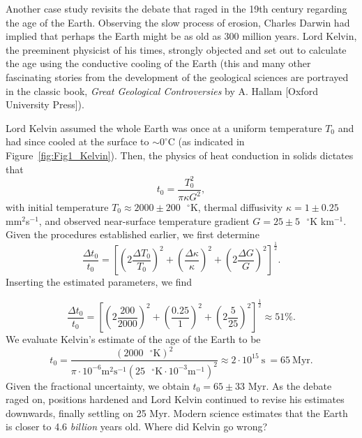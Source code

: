Another case study revisits the debate that raged in the 19th century regarding the age of the Earth.
Observing the slow process of erosion, Charles Darwin had implied that perhaps the Earth might be
as old as 300 million years.  Lord Kelvin, the preeminent physicist of his times, strongly objected
and set out to calculate the age using the conductive cooling of the Earth (this and many other fascinating
stories from the development of the geological sciences are portrayed in the classic book, \emph{Great Geological Controversies} by
A. Hallam [Oxford University Press]).
\begin{example}
Lord Kelvin assumed the whole Earth
was once at a uniform temperature $T_{0}$ and had since cooled at the surface to $\sim 0^{\circ}$C (as indicated in Figure~\ref{fig:Fig1_Kelvin}).
Then, the physics of heat conduction in solids dictates that
\begin{equation}
	t_{0} = \frac{T_{0}^{2}}{\pi \kappa G^{2}},
\end{equation}
with initial temperature $T_{0}  \approx 2000 \pm 200\mbox{ }^{\circ}\mbox{K}$, thermal diffusivity
$\kappa = 1 \pm 0.25$ mm$^{2}$s$^{-1}$, and observed near-surface temperature gradient
$G = 25 \pm 5\mbox{ }^{\circ}\mbox{K}$ km$^{-1}$.  Given the procedures established earlier, we first determine
\begin{equation}
	\frac{\Delta t_{0}}{t_{0}} = \left[ \left(2\frac{\Delta T_{0}}{T_{0}}\right)^{2} + \left(\frac{\Delta \kappa}{\kappa}\right)^{2} + \left(2\frac{\Delta G}{G}\right)^{2} \right]^{\frac{1}{2}}.
\end{equation}
Inserting the estimated parameters, we find

\begin{equation}
	\frac{\Delta t_{0}}{t_{0}} = \left[ \left(2\frac{200}{2000}\right)^{2} + \left(\frac{0.25}{1}\right)^{2} + \left(2\frac{5}{25}\right)^{2} \right]^{\frac{1}{2}} \approx 51\%.
\end{equation}
We evaluate Kelvin's estimate of the age of the Earth to be
\begin{equation}
	t_{0} = \frac{(2000\mbox{ }^{\circ}\mbox{K})^{2}}{\pi \cdot 10^{-6} \mbox{m}^{2} \mbox{s}^{-1} (25\mbox{ }^{\circ}\mbox{K} \cdot 10^{-3} \mbox{m}^{-1})^{2}} \approx 2 \cdot 10^{15} \ \mbox{s} \ = 65 \ \mbox{Myr}.
\end{equation}
Given the fractional uncertainty, we obtain $t_{0} = 65 \pm 33$ Myr.  As the debate raged on,
positions hardened and Lord Kelvin continued to revise his
estimates downwards, finally settling on 25 Myr.  Modern science estimates that the Earth is closer to
4.6 \emph{billion} years old.  Where did Kelvin go wrong?
\end{example}

